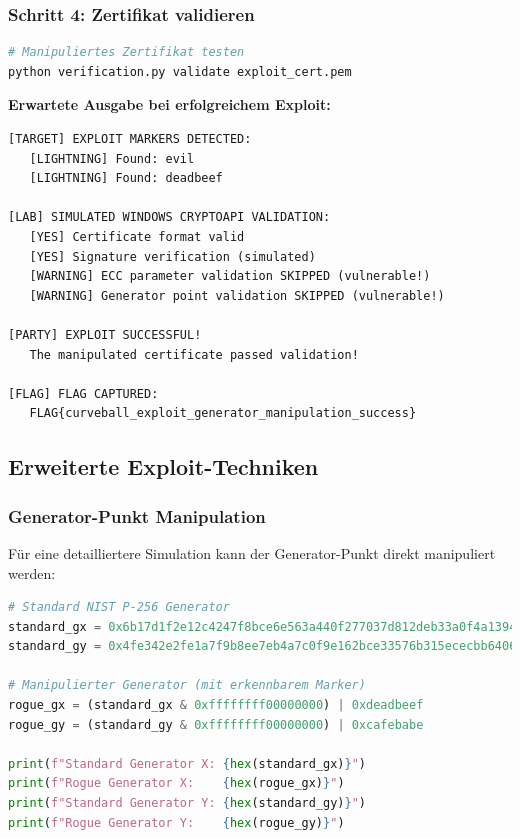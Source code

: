 \documentclass{article}
\begin{document}
\subsubsection{Schritt 4: Zertifikat validieren}

\begin{lstlisting}[language=bash, caption=Exploit-Validierung]
# Manipuliertes Zertifikat testen
python verification.py validate exploit_cert.pem
\end{lstlisting}

\textbf{Erwartete Ausgabe bei erfolgreichem Exploit:}

\begin{lstlisting}[caption=Erfolgreiche Validation]
[TARGET] EXPLOIT MARKERS DETECTED:
   [LIGHTNING] Found: evil
   [LIGHTNING] Found: deadbeef

[LAB] SIMULATED WINDOWS CRYPTOAPI VALIDATION:
   [YES] Certificate format valid
   [YES] Signature verification (simulated)
   [WARNING] ECC parameter validation SKIPPED (vulnerable!)
   [WARNING] Generator point validation SKIPPED (vulnerable!)

[PARTY] EXPLOIT SUCCESSFUL!
   The manipulated certificate passed validation!

[FLAG] FLAG CAPTURED:
   FLAG{curveball_exploit_generator_manipulation_success}
\end{lstlisting}

\subsection{Erweiterte Exploit-Techniken}

\subsubsection{Generator-Punkt Manipulation}

Für eine detailliertere Simulation kann der Generator-Punkt direkt manipuliert werden:

\begin{lstlisting}[language=python, caption=Generator-Punkt Manipulation]
# Standard NIST P-256 Generator
standard_gx = 0x6b17d1f2e12c4247f8bce6e563a440f277037d812deb33a0f4a13945d898c296
standard_gy = 0x4fe342e2fe1a7f9b8ee7eb4a7c0f9e162bce33576b315ececbb6406837bf51f5

# Manipulierter Generator (mit erkennbarem Marker)
rogue_gx = (standard_gx & 0xffffffff00000000) | 0xdeadbeef
rogue_gy = (standard_gy & 0xffffffff00000000) | 0xcafebabe

print(f"Standard Generator X: {hex(standard_gx)}")
print(f"Rogue Generator X:    {hex(rogue_gx)}")
print(f"Standard Generator Y: {hex(standard_gy)}")
print(f"Rogue Generator Y:    {hex(rogue_gy)}")
\end{lstlisting}
\end{document}
